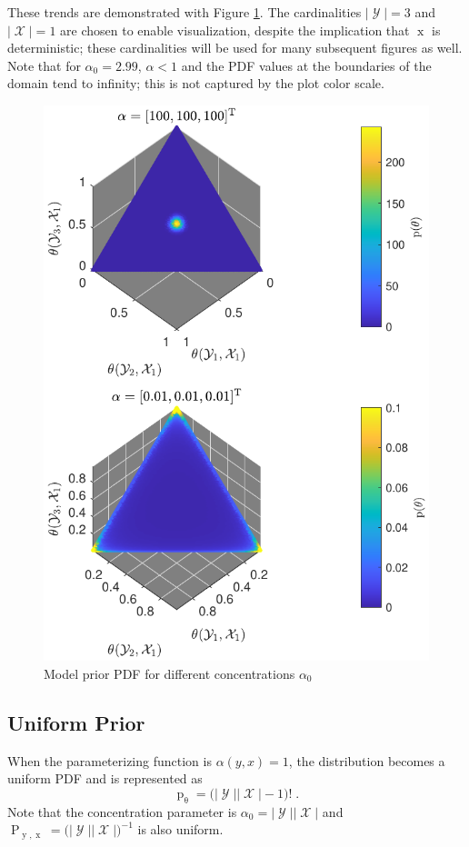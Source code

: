 \documentclass[12pt]{report}
\DeclareMathOperator{\xrm}{\mathrm{x}}
\DeclareMathOperator{\yrm}{\mathrm{y}}
\DeclareMathOperator{\Prm}{\mathrm{P}}
\DeclareMathOperator{\prm}{\mathrm{p}}
\DeclareMathOperator{\Xcal}{\mathcal{X}}
\DeclareMathOperator{\Ycal}{\mathcal{Y}}
\begin{document}
These trends are demonstrated with Figure \ref{fig:P_theta}. The cardinalities $|\Ycal| = 3$ and $|\Xcal| = 1$ are chosen to enable visualization, despite the implication that $\xrm$ is deterministic; these cardinalities will be used for many subsequent figures as well. Note that for $\alpha_0=2.99$, $\alpha < 1$ and the PDF values at the boundaries of the domain tend to infinity; this is not captured by the plot color scale.

\begin{figure}
\centering
\includegraphics[width=0.7\linewidth]{P_theta.pdf}
\caption{Model prior PDF for different concentrations $\alpha_0$}
\label{fig:P_theta}
\end{figure}





\subsection{Uniform Prior}

When the parameterizing function is $\alpha(y,x) = 1$, the distribution becomes a uniform PDF and is represented as
\begin{equation}
\prm_{\uptheta} = \big( |\Ycal||\Xcal|-1 \big)! \;.
\end{equation}
Note that the concentration parameter is $\alpha_0 = |\Ycal||\Xcal|$ and $\Prm_{\yrm,\xrm} = \big( |\Ycal||\Xcal| \big)^{-1}$ is also uniform. 
\end{document}
